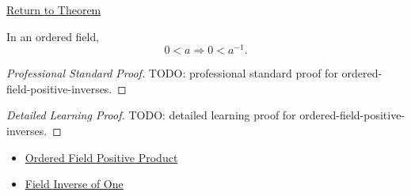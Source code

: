 \newpage
{}
\label{prf:ordered-field-positive-inverses}

\begin{remark*}[Return]
\hyperref[thm:reciprocal-reverses-order-on-positives-q]{Return to Theorem}
\end{remark*}

\begin{theorem*}
In an ordered field,
\[
0<a
\Longrightarrow
0<a^{-1}.
\]
\end{theorem*}

\begin{proof}[Professional Standard Proof]
\LRAProofBodyStart
TODO: professional standard proof for ordered-field-positive-inverses.
\end{proof}

\begin{proof}[Detailed Learning Proof]
\LRAProofBodyStart
TODO: detailed learning proof for ordered-field-positive-inverses.
\end{proof}

\begin{remark*}
\end{remark*}

\begin{dependencies}
\begin{itemize}
  \item \hyperref[thm:ordered-field-positive-product]{Ordered Field Positive Product}
  \item \hyperref[thm:field-inverse-of-one]{Field Inverse of One}
\end{itemize}
\end{dependencies}

\clearpage
